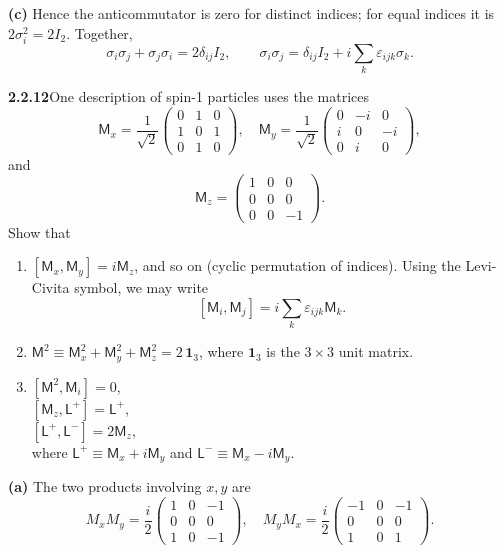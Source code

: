 \textbf{(c)} Hence the anticommutator is zero for distinct indices; for
equal indices it is $2\sigma_i^2=2I_2$. Together,
\[
\boxed{\sigma_i\sigma_j+\sigma_j\sigma_i=2\delta_{ij}I_2},
\qquad \sigma_i\sigma_j=\delta_{ij}I_2+
i\sum_k\varepsilon_{ijk}\sigma_k.
\]

\par\bigskip
\noindent\textbf{2.2.12}\quad One description of spin-1 particles uses the
matrices
\[
\mathsf{M}_{x}=\frac{1}{\sqrt{2}}\begin{pmatrix}0&1&0\\1&0&1\\0&1&0
\end{pmatrix},\quad
\mathsf{M}_{y}=\frac{1}{\sqrt{2}}\begin{pmatrix}0&-i&0\\i&0&-i\\0&i&0
\end{pmatrix},
\]
and
\[
\mathsf{M}_{z}=\begin{pmatrix}1&0&0\\0&0&0\\0&0&-1\end{pmatrix}.
\]
Show that
\begin{enumerate}
\item[(a)] $[\mathsf{M}_{x},\mathsf{M}_{y}]=i\mathsf{M}_{z}$, and so on
  (cyclic permutation of indices). Using the Levi-Civita symbol, we may write
  \[
  [\mathsf{M}_{i},\mathsf{M}_{j}]=i\sum_{k}\varepsilon_{ijk}\mathsf{M}_{k}.
  \]
\item[(b)] $\mathsf{M}^{2}\equiv\mathsf{M}_{x}^{2}+\mathsf{M}_{y}^{2}
  +\mathsf{M}_{z}^{2}=2\,\mathbf{1}_{3}$, where $\mathbf{1}_{3}$ is the
  $3\times3$ unit matrix.
\item[(c)] $[\mathsf{M}^{2},\mathsf{M}_{i}]=0$,\\
  $[\mathsf{M}_{z},\mathsf{L}^{+}]=\mathsf{L}^{+}$,\\
  $[\mathsf{L}^{+},\mathsf{L}^{-}]=2\mathsf{M}_{z}$,\\
  where $\mathsf{L}^{+}\equiv\mathsf{M}_{x}+i\mathsf{M}_{y}$ and
  $\mathsf{L}^{-}\equiv\mathsf{M}_{x}-i\mathsf{M}_{y}$.
\end{enumerate}
\solution
\textbf{(a)} The two products involving $x,y$ are
\[
M_xM_y=\frac i2\begin{pmatrix}1&0&-1\\0&0&0\\1&0&-1\end{pmatrix},
\quad
M_yM_x=\frac i2\begin{pmatrix}-1&0&-1\\0&0&0\\1&0&1\end{pmatrix}.
\]
